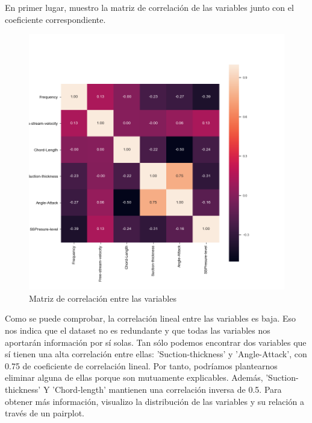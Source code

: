 En primer lugar, muestro la matriz de correlación de las variables junto con el coeficiente correspondiente.
\begin{figure}[H] %
	\centering
	\includegraphics[scale=0.6]{corr-airfoil.png}  %
	\caption{Matriz de correlación entre las variables} 
	\label{fig:corr-airfoil}
\end{figure}

Como se puede comprobar, la correlación lineal entre las variables es baja. Eso nos indica que el dataset no es redundante y que todas las variables nos aportarán información por sí solas. Tan sólo podemos encontrar dos variables que sí tienen una alta correlación entre ellas: 'Suction-thickness' y 'Angle-Attack', con 0.75 de coeficiente de correlación lineal. Por tanto, podríamos plantearnos eliminar alguna de ellas porque son mutuamente explicables. Además, 'Suction-thickness' Y 'Chord-length' mantienen una correlación inversa de 0.5. Para obtener más información, visualizo la distribución de las variables y su relación a través de un pairplot.

